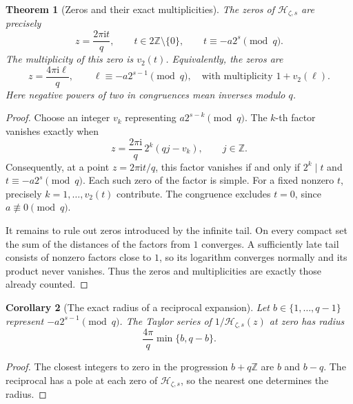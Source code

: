 \documentclass[11pt,letterpaper]{article}
\numberwithin{equation}{section}
\newtheorem{theorem}{Theorem}[section]
\newtheorem{corollary}[theorem]{Corollary}
\theoremstyle{definition}
\theoremstyle{remark}
\newcommand{\Z}{\mathbb Z}
\newcommand{\ii}{\mathrm i}
\newcommand{\Hp}{\mathcal H}
\begin{document}
\begin{theorem}[Zeros and their exact multiplicities]
\label{thm:zeros}
The zeros of \(\Hp_{\zeta,s}\) are precisely
\begin{equation}
 z=\frac{2\pi\ii t}{q},\qquad
 t\in2\Z\setminus\{0\},\qquad
 t\equiv-a2^s\pmod q.
 \label{eq:Hzeros}
\end{equation}
The multiplicity of this zero is \(v_2(t)\). Equivalently, the zeros are
\begin{equation}
 z=\frac{4\pi\ii\ell}{q},\qquad
 \ell\equiv-a2^{s-1}\pmod q,
 \quad\text{with multiplicity }1+v_2(\ell).
 \label{eq:Hzerosell}
\end{equation}
Here negative powers of two in congruences mean inverses modulo \(q\).
\end{theorem}
\begin{proof}
Choose an integer \(v_k\) representing \(a2^{s-k}\pmod q\). The \(k\)-th factor vanishes exactly when
\[
 z=\frac{2\pi\ii}{q}\,2^k(qj-v_k),\qquad j\in\Z.
\]
Consequently, at a point \(z=2\pi\ii t/q\), this factor vanishes if and only if \(2^k\mid t\) and \(t\equiv-a2^s\pmod q\). Each such zero of the factor is simple. For a fixed nonzero \(t\), precisely \(k=1,\ldots,v_2(t)\) contribute. The congruence excludes \(t=0\), since \(a\not\equiv0\pmod q\).

It remains to rule out zeros introduced by the infinite tail. On every compact set the sum of the distances of the factors from \(1\) converges. A sufficiently late tail consists of nonzero factors close to \(1\), so its logarithm converges normally and its product never vanishes. Thus the zeros and multiplicities are exactly those already counted.
\end{proof}

\begin{corollary}[The exact radius of a reciprocal expansion]
Let \(b\in\{1,\ldots,q-1\}\) represent \(-a2^{s-1}\pmod q\). The Taylor series of \(1/\Hp_{\zeta,s}(z)\) at zero has radius
\begin{equation}
 \frac{4\pi}{q}\min\{b,q-b\}.
 \label{eq:reciprocalradius}
\end{equation}
\end{corollary}
\begin{proof}
The closest integers to zero in the progression \(b+q\Z\) are \(b\) and \(b-q\). The reciprocal has a pole at each zero of \(\Hp_{\zeta,s}\), so the nearest one determines the radius.
\end{proof}
\end{document}
